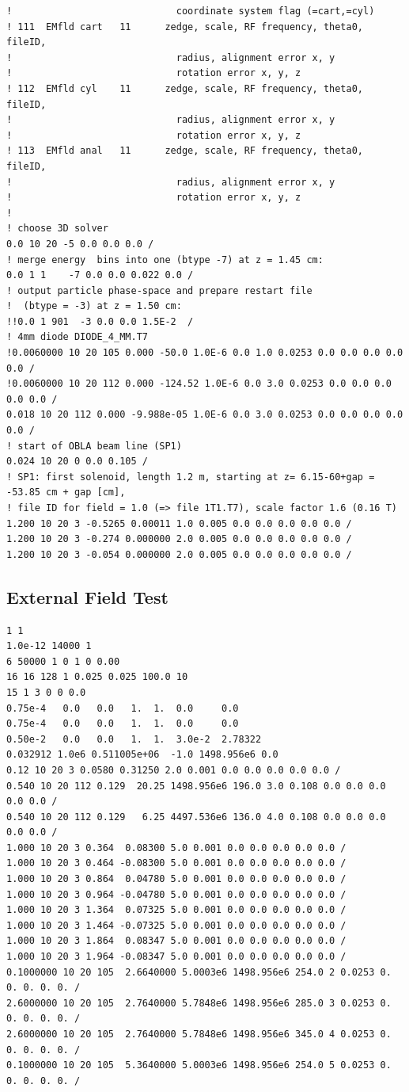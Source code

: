 \documentclass{psi-note}    %
\begin{document}
{\begin{verbatim}
!                             coordinate system flag (=cart,=cyl)
! 111  EMfld cart   11      zedge, scale, RF frequency, theta0, fileID,
!                             radius, alignment error x, y
!                             rotation error x, y, z
! 112  EMfld cyl    11      zedge, scale, RF frequency, theta0, fileID,
!                             radius, alignment error x, y
!                             rotation error x, y, z
! 113  EMfld anal   11      zedge, scale, RF frequency, theta0, fileID,
!                             radius, alignment error x, y
!                             rotation error x, y, z
!
! choose 3D solver
0.0 10 20 -5 0.0 0.0 0.0 /
! merge energy  bins into one (btype -7) at z = 1.45 cm:
0.0 1 1    -7 0.0 0.0 0.022 0.0 /
! output particle phase-space and prepare restart file 
!  (btype = -3) at z = 1.50 cm:
!!0.0 1 901  -3 0.0 0.0 1.5E-2  /
! 4mm diode DIODE_4_MM.T7
!0.0060000 10 20 105 0.000 -50.0 1.0E-6 0.0 1.0 0.0253 0.0 0.0 0.0 0.0 0.0 /
!0.0060000 10 20 112 0.000 -124.52 1.0E-6 0.0 3.0 0.0253 0.0 0.0 0.0 0.0 0.0 /
0.018 10 20 112 0.000 -9.988e-05 1.0E-6 0.0 3.0 0.0253 0.0 0.0 0.0 0.0 0.0 /
! start of OBLA beam line (SP1)
0.024 10 20 0 0.0 0.105 /
! SP1: first solenoid, length 1.2 m, starting at z= 6.15-60+gap = -53.85 cm + gap [cm], 
! file ID for field = 1.0 (=> file 1T1.T7), scale factor 1.6 (0.16 T)
1.200 10 20 3 -0.5265 0.00011 1.0 0.005 0.0 0.0 0.0 0.0 0.0 /
1.200 10 20 3 -0.274 0.000000 2.0 0.005 0.0 0.0 0.0 0.0 0.0 /
1.200 10 20 3 -0.054 0.000000 2.0 0.005 0.0 0.0 0.0 0.0 0.0 /
\end{verbatim}

\subsection{External Field Test}
\begin{verbatim}
1 1
1.0e-12 14000 1
6 50000 1 0 1 0 0.00
16 16 128 1 0.025 0.025 100.0 10
15 1 3 0 0 0.0
0.75e-4   0.0   0.0   1.  1.  0.0     0.0
0.75e-4   0.0   0.0   1.  1.  0.0     0.0
0.50e-2   0.0   0.0   1.  1.  3.0e-2  2.78322
0.032912 1.0e6 0.511005e+06  -1.0 1498.956e6 0.0
0.12 10 20 3 0.0580 0.31250 2.0 0.001 0.0 0.0 0.0 0.0 0.0 /
0.540 10 20 112 0.129  20.25 1498.956e6 196.0 3.0 0.108 0.0 0.0 0.0 0.0 0.0 /
0.540 10 20 112 0.129   6.25 4497.536e6 136.0 4.0 0.108 0.0 0.0 0.0 0.0 0.0 /
1.000 10 20 3 0.364  0.08300 5.0 0.001 0.0 0.0 0.0 0.0 0.0 /
1.000 10 20 3 0.464 -0.08300 5.0 0.001 0.0 0.0 0.0 0.0 0.0 /
1.000 10 20 3 0.864  0.04780 5.0 0.001 0.0 0.0 0.0 0.0 0.0 /
1.000 10 20 3 0.964 -0.04780 5.0 0.001 0.0 0.0 0.0 0.0 0.0 /
1.000 10 20 3 1.364  0.07325 5.0 0.001 0.0 0.0 0.0 0.0 0.0 /
1.000 10 20 3 1.464 -0.07325 5.0 0.001 0.0 0.0 0.0 0.0 0.0 /
1.000 10 20 3 1.864  0.08347 5.0 0.001 0.0 0.0 0.0 0.0 0.0 /
1.000 10 20 3 1.964 -0.08347 5.0 0.001 0.0 0.0 0.0 0.0 0.0 /
0.1000000 10 20 105  2.6640000 5.0003e6 1498.956e6 254.0 2 0.0253 0. 0. 0. 0. 0. /
2.6000000 10 20 105  2.7640000 5.7848e6 1498.956e6 285.0 3 0.0253 0. 0. 0. 0. 0. /
2.6000000 10 20 105  2.7640000 5.7848e6 1498.956e6 345.0 4 0.0253 0. 0. 0. 0. 0. /
0.1000000 10 20 105  5.3640000 5.0003e6 1498.956e6 254.0 5 0.0253 0. 0. 0. 0. 0. /
\end{verbatim}

}
\end{document}
